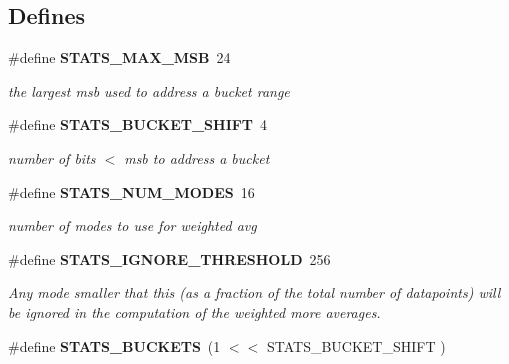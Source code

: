 \subsection*{Defines}
\begin{CompactItemize}
\item 
{}
\#define {\bf STATS\_\-MAX\_\-MSB}\ 24\label{bucket__stats_8h_a0}

\begin{CompactList}\small\item\em the largest msb used to address a bucket range\item\end{CompactList}\item 
{}
\#define {\bf STATS\_\-BUCKET\_\-SHIFT}\ 4\label{bucket__stats_8h_a1}

\begin{CompactList}\small\item\em number of bits $<$ msb to address a bucket\item\end{CompactList}\item 
{}
\#define {\bf STATS\_\-NUM\_\-MODES}\ 16\label{bucket__stats_8h_a2}

\begin{CompactList}\small\item\em number of modes to use for weighted avg\item\end{CompactList}\item 
\#define {\bf STATS\_\-IGNORE\_\-THRESHOLD}\ 256
\begin{CompactList}\small\item\em Any mode smaller that this (as a fraction of the total number of datapoints) will be ignored in the computation of the weighted more averages.\item\end{CompactList}\item 
{}
\#define {\bf STATS\_\-BUCKETS}\ (1 $<$$<$ STATS\_\-BUCKET\_\-SHIFT )\label{bucket__stats_8h_a4}


\end{CompactItemize}
